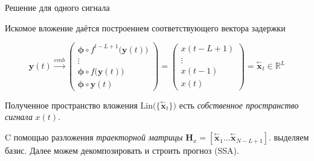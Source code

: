 \documentclass[10pt]{beamer}
\newcommand{\delayV}[1]{\overset{\leftarrow}{\textbf{x}}_{#1}}
\theoremstyle{definition}
\begin{document}
	\begin{frame}{Решение для одного сигнала}
		
		\begin{theorem}[Такенс]
			Искомое вложение даётся построением соответствующего вектора задержки 
			
			\begin{equation*}
				\textbf{y}(t) \xrightarrow{emb} \begin{pmatrix}
					\boldsymbol{\phi} \circ f^{t - L + 1}\bigl(\textbf{y}(t)\bigl) \\
					\vdots \\
					\boldsymbol{\phi} \circ f\bigl(\textbf{y}(t)\bigl) \\
					\boldsymbol{\phi} \circ \textbf{y}(t)
				\end{pmatrix} = \begin{pmatrix}
					x(t - L + 1) \\
					\vdots \\
					x(t - 1) \\
					x(t)
				\end{pmatrix} = \delayV{t} \in \mathbb{R}^L
			\end{equation*}
			
		\end{theorem}
		
		Полученное пространство вложения $ \text{Lin}\bigl(\{\delayV{t}\}\bigl) $ есть \emph{собственное пространство сигнала} $ x(t) $.
		
		C помощью разложения \emph{траекторной матрицы} $ \mathbf{H}_x = [ \delayV{1} \ldots  \delayV{N - L + 1}]. $ выделяем базис. Далее можем декомпозировать и строить прогноз (SSA). 
	
	\end{frame}
	
\end{document}
